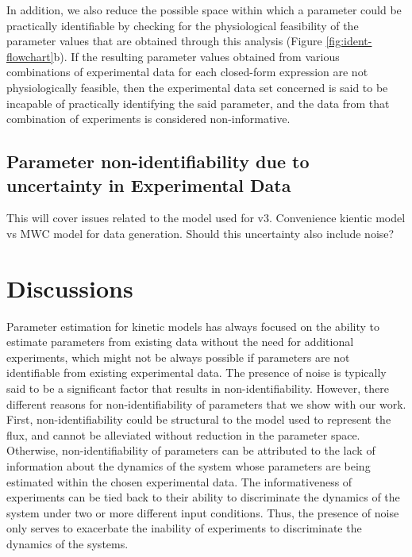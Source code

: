 \documentclass[10pt]{article}
\begin{document}
	In addition, we also reduce the possible space within which a parameter could be practically identifiable by checking for the physiological feasibility of the parameter values that are obtained through this analysis (Figure \ref{fig:ident-flowchart}b). If the resulting parameter values obtained from various combinations of experimental data for each closed-form expression are not physiologically feasible, then the experimental data set concerned is said to be incapable of practically identifying the said parameter, and the data from that combination of experiments is considered non-informative.
	
	
	\subsection{Parameter non-identifiability due to uncertainty in Experimental Data}\label{sec:uncertainty}
	
	
	This will cover issues related to the model used for v3. Convenience kientic model vs MWC model for data generation. Should this uncertainty also include noise?			
	
	
	
	\section{Discussions}\label{sec:discussion}	
	Parameter estimation for kinetic models has always focused on the ability to estimate parameters from existing data without the need for additional experiments, which might not be always possible if parameters are not identifiable from existing experimental data. The presence of noise is typically said to be a significant factor that results in non-identifiability. However, there different reasons for non-identifiability of parameters that we show with our work. First, non-identifiability could be structural to the model used to represent the flux, and cannot be alleviated without reduction in the parameter space. Otherwise, non-identifiability of parameters can be attributed to the lack of information about the dynamics of the system whose parameters are being estimated within the chosen experimental data. The informativeness of experiments can be tied back to their ability to discriminate the dynamics of the system under two or more different input conditions. Thus, the presence of noise only serves to exacerbate the inability of experiments to discriminate the dynamics of the systems. 
	
\end{document}
